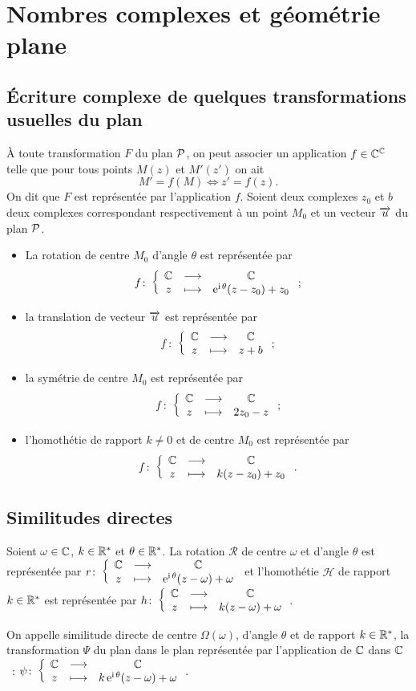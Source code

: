 \section{Nombres complexes et géométrie plane}
\label{sec:complexesetgeometrie}
\subsection{Écriture complexe de quelques transformations usuelles du plan}
\label{subsec:ecriturecomplexeettransformations}
À toute transformation \(F\) du plan \(\P\), on peut associer un application \(f \in \C^{\C}\) telle que pour tous points \(M(z)\) et \(M'(z')\) on ait
\begin{equation}
  M'=f(M) \iff z'=f(z).
\end{equation}
On dit que \(F\) est représentée par l'application \(f\). Soient deux complexes \(z_0\) et \(b\) deux complexes correspondant respectivement à un point \(M_0\) et un vecteur \(\vect{u}\) du plan \(\P\).
\begin{itemize}
\item La rotation de centre \(M_0\) d'angle \(\theta\) est représentée par
  \begin{equation}
    \fonction{f}{\C}{\C}{z}{\expc{}{\theta}(z-z_0) +z_0};
  \end{equation}
\item la translation de vecteur \(\vect{u}\) est représentée par
  \begin{equation}
    \fonction{f}{\C}{\C}{z}{z+b};
  \end{equation}
\item la symétrie de centre \(M_0\) est représentée par
  \begin{equation}
    \fonction{f}{\C}{\C}{z}{2z_0-z};
  \end{equation}
\item l'homothétie de rapport \(k\neq 0\) et de centre \(M_0\) est représentée par
  \begin{equation}
    \fonction{f}{\C}{\C}{z}{k(z-z_0)+z_0}.
  \end{equation}
\end{itemize}
%
\subsection{Similitudes directes}
\label{subsec:simdirecte}
Soient \(\omega \in \C\), \(k\in \R^*\) et \(\theta \in \R^*\). La rotation \(\mathcal{R}\) de centre \(\omega\) et d'angle \(\theta\) est représentée par \(\fonction{r}{\C}{\C}{z}{\expc{}{\theta}(z-\omega)+\omega}\) et l'homothétie \(\mathcal{H}\) de rapport \(k \in \R^*\) est représentée par \(\fonction{h}{\C}{\C}{z}{k(z-\omega)+\omega}\).
%
\begin{defdef}
  On appelle similitude directe de centre \(\Omega(\omega)\), d'angle \(\theta\) et de rapport \(k \in \R^*\), la transformation \(\Psi\) du plan dans le plan représentée par l'application de \(\C\) dans \(\C\)~: \(\fonction{\psi}{\C}{\C}{z}{\expc{k}{\theta}(z-\omega)+\omega}\).
\end{defdef}

